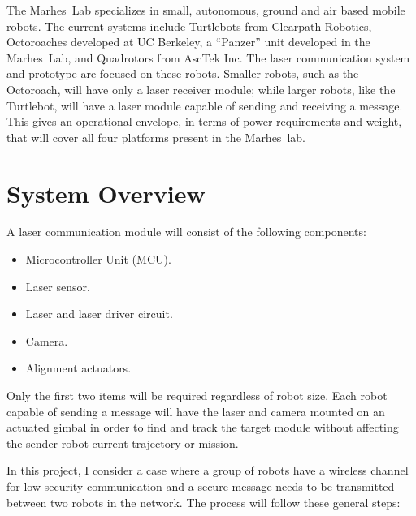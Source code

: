 \documentclass[botnum, fleqn]{unmeethesis}
\def \marhes{{\sc Marhes~}}
\begin{document}
The  \marhes Lab specializes in small, autonomous, ground and air based mobile robots. The current systems include Turtlebots from Clearpath Robotics, Octoroaches developed at UC Berkeley, a “Panzer” unit developed in the \marhes Lab, and Quadrotors from AscTek Inc. The laser communication system and prototype are focused on these robots. Smaller robots, such as the Octoroach, will have only a laser receiver module; while larger robots, like the Turtlebot, will have a laser module capable of sending and receiving a message. This gives an operational envelope, in terms of power requirements and weight, that will cover all four platforms present in the \marhes lab.

\clearpage

\section*{System Overview}

A laser communication module will consist of the following components:

\begin{itemize}
 \item Microcontroller Unit (MCU).
 \item Laser sensor.
 \item Laser and laser driver circuit.
 \item Camera.
 \item Alignment actuators.
\end{itemize}

Only the first two items will be required regardless of robot size. Each robot capable of sending a message will have the laser and camera mounted on an actuated gimbal in order to find and track the target module without affecting the sender robot current trajectory or mission.

In this project, I consider a case where a group of robots have a wireless channel for low security communication and a secure message needs to be transmitted between two robots in the network. The process will follow these general steps:
\end{document}
